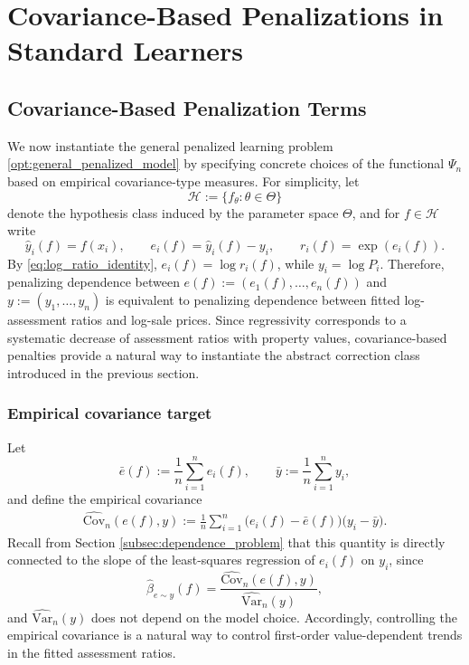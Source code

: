 \documentclass[12pt, draft]{article}
\theoremstyle{plain}
\theoremstyle{definition}
\newcommand{\1}{\mathbf{1}}
\newcommand{\Cov}{\text{Cov}}
\newcommand{\Var}{\text{Var}}
\renewcommand{\H}{\mathcal{H}}
\begin{document}
{\section{Covariance-Based Penalizations in Standard Learners}
\label{sec:covariance_penalty_learning_in_learners}

\subsection{Covariance-Based Penalization Terms}
\label{sec:covariance_penalty_learning}

We now instantiate the general penalized learning problem \eqref{opt:general_penalized_model} by specifying concrete choices of the functional $\Psi_n$ based on empirical covariance-type measures. For simplicity, let
\[
\H := \{f_\theta : \theta \in \Theta\}
\]
denote the hypothesis class induced by the parameter space $\Theta$, and for $f \in \H$ write
\[
\hat y_i(f) = f(x_i),
\qquad
e_i(f) = \hat y_i(f) - y_i,
\qquad
r_i(f) = \exp(e_i(f)).
\]
By \eqref{eq:log_ratio_identity}, $e_i(f)=\log r_i(f)$, while $y_i=\log P_i$. Therefore, penalizing dependence between $e(f):=(e_1(f),\dots,e_n(f))$ and $y:=(y_1,\dots,y_n)$ is equivalent to penalizing dependence between fitted log-assessment ratios and log-sale prices. Since regressivity corresponds to a systematic decrease of assessment ratios with property values, covariance-based penalties provide a natural way to instantiate the abstract correction class introduced in the previous section.

\subsubsection{Empirical covariance target}

Let
\[
\bar e(f) := \frac{1}{n}\sum_{i=1}^n e_i(f),
\qquad
\bar y := \frac{1}{n}\sum_{i=1}^n y_i,
\]
and define the empirical covariance
\begin{align}
    \label{eq:empirical_covariance}
    \widehat{\Cov}_n(e(f),y)
    :=
    \frac{1}{n}\sum_{i=1}^n
    \bigl(e_i(f)-\bar e(f)\bigr)\bigl(y_i-\bar y\bigr).
\end{align}
Recall from Section \ref{subsec:dependence_problem} that this quantity is directly connected to the slope of the least-squares regression of $e_i(f)$ on $y_i$, since
\[
\widehat{\beta}_{e\sim y}(f)
=
\frac{\widehat{\Cov}_n(e(f),y)}{\widehat{\Var}_n(y)},
\]
and $\widehat{\Var}_n(y)$ does not depend on the model choice. Accordingly, controlling the empirical covariance is a natural way to control first-order value-dependent trends in the fitted assessment ratios.

}
\end{document}
